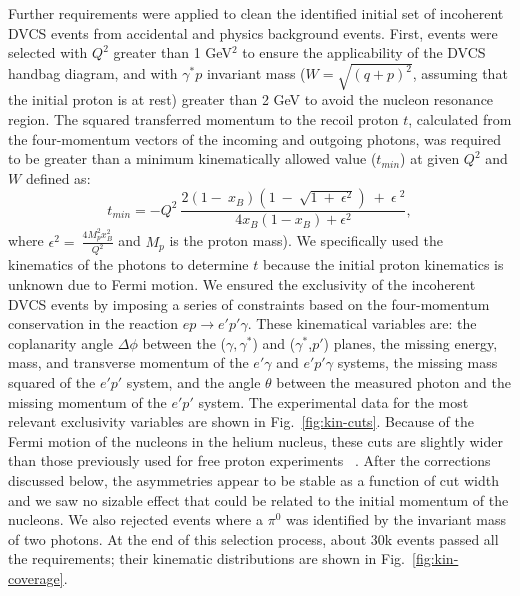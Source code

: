 \documentclass[twocolumn,nofootinbib,prl,superscriptaddress,secnumarabic,amssymb,nobibnotes,aps,floatfix]{revtex4}
\begin{document}
Further requirements were applied to clean the identified initial set of 
incoherent DVCS events from accidental and physics background events. First, 
events were selected with $Q^{2}$ greater than 1 GeV$^2$ to ensure the 
applicability of the DVCS handbag diagram, and with $\gamma^{*}p$ invariant 
mass ($W=\sqrt{(q+p)^2}$, assuming that the initial proton is at rest) greater 
than 2 GeV to avoid the nucleon resonance region. The squared transferred 
momentum to the recoil proton $t$, calculated from the four-momentum vectors of 
the incoming and outgoing photons, was required to be greater than a minimum 
kinematically allowed value ($t_{min}$) at given $Q^2$ and $W$ defined as: 
\begin{equation}
t_{min} 
   =-Q^{2}~\frac{2(1-~x_{B})(1~-~\sqrt{1~+~\epsilon^{2}})~+~\epsilon~^{2}}{4x_{B}(1-x_{B})+\epsilon^{2}},
\end{equation}
where $\epsilon^{2}=~\frac{4M^{2}_{p}x^{2}_{B}}{Q^{2}}$ and $M_{p}$ is the 
proton mass). We specifically used the kinematics of the photons to determine 
$t$ because the initial proton kinematics is unknown due to Fermi motion. We 
ensured the exclusivity of the incoherent DVCS events by imposing a series of 
constraints based on the four-momentum conservation in the reaction 
$ep\rightarrow e'p'\gamma$. These kinematical variables are: the coplanarity 
angle $\Delta\phi$ between the ($\gamma,\gamma^*$) and ($\gamma^*$,$p'$) 
planes, the missing energy, mass, and transverse momentum of the $e'\gamma$ and 
$e'p'\gamma$ systems, the missing mass squared of the $e'p'$ system, and the 
angle $\theta$ between the measured photon and the missing momentum of the 
$e'p'$ system. The experimental data for the most relevant exclusivity 
variables are shown in Fig.~\ref{fig:kin-cuts}. Because of the Fermi motion of 
the nucleons in the helium nucleus, these cuts
are slightly wider than those previously used for free proton experiments~%
\cite{Girod:2007aa}. After the corrections discussed below, the asymmetries 
appear to be stable as a function of cut width and we saw no sizable effect 
that could be related to the initial momentum of the nucleons. We also rejected 
events where a $\pi^0$ was identified by the invariant mass of two photons. At 
the end of this selection process, about 30k events passed all the 
requirements; their kinematic distributions are shown in 
Fig.~\ref{fig:kin-coverage}.  
\end{document}
